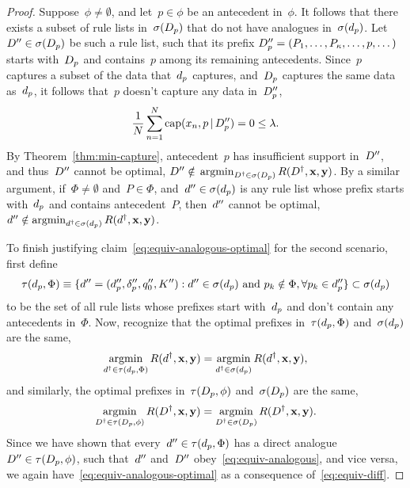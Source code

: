 \begin{arxiv}
\begin{proof}
Suppose~${\phi \neq \emptyset}$, and let~${p \in \phi}$
be an antecedent in~$\phi$.
%
It follows that there exists a subset of rule lists
in~$\sigma(D_p)$ that do not have analogues
in~$\sigma(d_p)$.
%
Let~${{D}'' \in \sigma(D_p)}$ be such a rule list,
such that its prefix ${D_p'' = (P_1, \dots, P_\kappa, \dots, p, \dots)}$
starts with~$D_p$ and contains~$p$ among its remaining antecedents.
%
Since~$p$ captures a subset of the data that~$d_p$ captures,
and~$D_p$ captures the same data as~$d_p$,
it follows that~$p$ doesn't capture any data in~$D_p''$, \ie
\begin{align}
\frac{1}{N} \sum_{n=1}^N \textnormal{cap}(x_n, p \,|\, D_p'') = 0 \le {\lambda}.
\end{align}
By Theorem~\ref{thm:min-capture}, antecedent~$p$ has insufficient
support in~${D}''$, and thus~${D}''$ cannot be optimal, \ie
${{D}'' \notin}$ ${\operatorname*{argmin}_{{D}^\dagger \in \sigma(D_p)} R({D}^\dagger, \mathbf{x}, \mathbf{y})}$.
%
By a similar argument, if~${\Phi \neq \emptyset}$
and~${P \in \Phi}$, and~${{d}'' \in \sigma(d_p)}$
is any rule list whose prefix starts with~$d_p$
and contains antecedent~$P$, then~${d}''$ cannot be optimal, \ie
${{d}'' \notin \operatorname*{argmin}_{{d}^\dagger \in \sigma(d_p)} R({d}^\dagger, \mathbf{x}, \mathbf{y})}$.

To finish justifying claim~\eqref{eq:equiv-analogous-optimal}
for the second scenario, first define
\begin{align}
\tau(d_p, \Phi) \equiv
  \{{d}'' = (d_p'', \delta_p'', q_0'', K'') :
    {d}'' \in \sigma(d_p) \textnormal{ and }
    p_k \notin \Phi, \forall p_k \in d_p''\} \subset \sigma(d_p)
\end{align}
to be the set of all rule lists whose prefixes start with~$d_p$
and don't contain any antecedents in~$\Phi$.
%
Now, recognize that the optimal prefixes in~$\tau(d_p, \Phi)$
and~$\sigma(d_p)$ are the same, \ie
\begin{align}
\operatorname*{argmin}_{{d}^\dagger \in \tau(d_p, \Phi)} R({d}^\dagger, \mathbf{x}, \mathbf{y})
= \operatorname*{argmin}_{{d}^\dagger \in \sigma(d_p)} R({d}^\dagger, \mathbf{x}, \mathbf{y}),
\end{align}
and similarly, the optimal prefixes in~$\tau(D_p, \phi)$
and~$\sigma(D_p)$ are the same, \ie
\begin{align}
\operatorname*{argmin}_{{D}^\dagger \in \tau(D_p, \phi)} R({D}^\dagger, \mathbf{x}, \mathbf{y})
= \operatorname*{argmin}_{{D}^\dagger \in \sigma(D_p)} R({D}^\dagger, \mathbf{x}, \mathbf{y}).
\end{align}
Since we have shown that every~${{d}'' \in \tau(d_p, \Phi)}$
has a direct analogue~${{D}'' \in \tau(D_p, \phi)}$,
such that~${d}''$ and~${D}''$ obey~\eqref{eq:equiv-analogous},
and vice versa, we again have~\eqref{eq:equiv-analogous-optimal}
as a consequence of~\eqref{eq:equiv-diff}.


\end{proof}
\end{arxiv}
